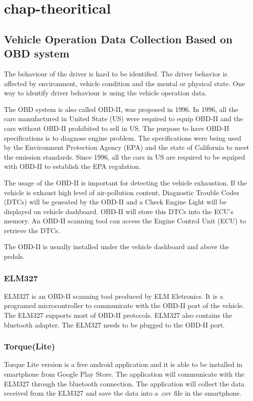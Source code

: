 \chapter{chap-theoritical}
\section{Vehicle Operation Data Collection Based on OBD system}
The behaviour of the driver is hard to be identified. The driver behavior is affected by environment, vehicle condition and the mental or physical state. One way to identify driver behaviour is using the vehicle operation data.

The OBD system is also called OBD-II, was proposed in 1996. In 1996, all the cars manufactured in United State (US) were required to equip OBD-II and the cars without OBD-II prohibited to sell in US. The purpose to have OBD-II specifications is to diagnose engine problem. The specifications were being used by the Environment Protection Agency (EPA) and the state of California to meet the emission standards. Since 1996, all the cars in US are required to be equiped with OBD-II to establish the EPA regulation. 

The usage of the OBD-II is important for detecting the vehicle exhaustion. If the vehicle is exhaust high level of air-pollution content, Diagnostic Trouble Codes (DTCs) will be geneated by the OBD-II and a Check Engine Light will be displayed on vehicle dashboard. OBD-II will store this DTCs into the ECU's memory. An OBD-II scanning tool can access the Engine Control Unit (ECU) to retrieve the DTCs.

The OBD-II is usually installed under the vehicle dashboard and above the pedals.
\subsection{ELM327}
ELM327 is an OBD-II scanning tool produced by ELM Eletronics. It is a programed microcontroller to communicate with the OBD-II port of the vehicle. The ELM327 supports most of OBD-II protocols. ELM327 also contains the bluetooth adapter. The ELM327 needs to be plugged to the OBD-II port.

\subsection{Torque(Lite)}
Torque Lite version is a free android application and it is able to be installed in smartphone from Google Play Store. The application will communicate with the ELM327 through the bluetooth connection. The application will collect the data received from the ELM327 and  save the data into a .csv file in the smartphone. 

